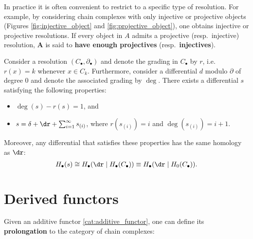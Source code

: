 	In practice it is often convenient to restrict to a specific type of resolution. For example, by considering chain complexes with only injective or projective objects (Figures \ref{fig:injective_object} and \ref{fig:projective_object}), one obtains injective or projective resolutions. If every object in $A$ admits a projective (resp.~injective) resolution, $\mathbf{A}$ is said to \textbf{have enough projectives} (resp.~\textbf{injectives}).

    \begin{theorem}\label{homalg:homological_perturbation}
        Consider a resolution $(C_\bullet,\partial_\bullet)$ and denote the grading in $C_\bullet$ by $r$, i.e.~$r(x)=k$ whenever $x\in C_k$. Furthermore, consider a differential $d$ modulo $\partial$ of degree 0 and denote the associated grading by $\deg$. There exists a differential $s$ satisfying the following properties:
        \begin{itemize}
            \item $\deg(s) - r(s) = 1$, and
            \item $s = \delta + \dr + \sum_{i=1}^\infty s_{(i)}$, where $r(s_{(i)})=i$ and $\deg(s_{(i)}) = i+1$.
        \end{itemize}
        Moreover, any differential that satisfies these properties has the same homology as $\dr$:
        \begin{gather}
            H_\bullet(s)\cong H_\bullet(\dr\mid H_\bullet(C_\bullet))\equiv H_\bullet(\dr\mid H_0(C_\bullet)).
        \end{gather}
    \end{theorem}

\section{Derived functors}

	Given an additive functor \ref{cat:additive_functor}, one can define its \textbf{prolongation} to the category of chain complexes:

